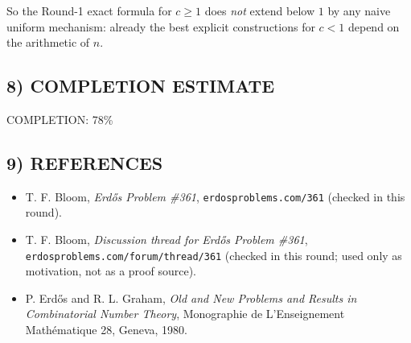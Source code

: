 So the Round-1 exact formula for $c\ge 1$ does \emph{not} extend below $1$ by any naive uniform mechanism: already the best explicit constructions for $c<1$ depend on the arithmetic of $n$.

\subsection*{8) COMPLETION ESTIMATE}
COMPLETION: 78\%

\subsection*{9) REFERENCES}
\begin{itemize}
\item T. F. Bloom, \emph{Erd\H{o}s Problem \#361}, \texttt{erdosproblems.com/361} (checked in this round).
\item T. F. Bloom, \emph{Discussion thread for Erd\H{o}s Problem \#361}, \texttt{erdosproblems.com/forum/thread/361} (checked in this round; used only as motivation, not as a proof source).
\item P. Erd\H{o}s and R. L. Graham, \emph{Old and New Problems and Results in Combinatorial Number Theory}, Monographie de L'Enseignement Math\'ematique 28, Geneva, 1980.
\end{itemize}
